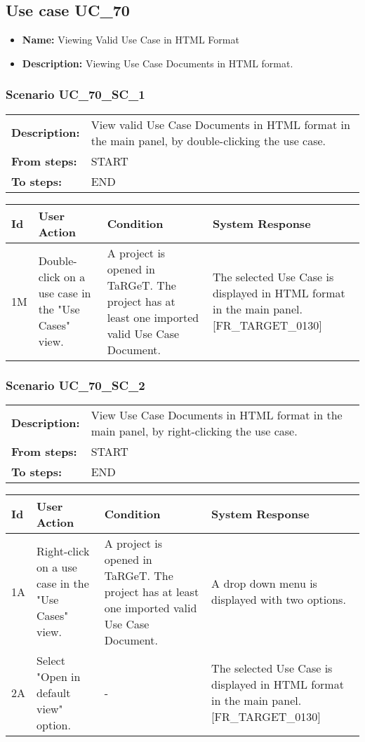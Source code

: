 \documentclass[a4paper,11pt]{article}
\newcommand{\bl}{\\ \hline}
\begin{document}
\subsection*{Use case UC_70}
\begin{itemize}
\item {\bf Name: }Viewing Valid Use Case in HTML Format
\item {\bf Description: }Viewing Use Case Documents in HTML format.
\end{itemize}
\subsubsection*{Scenario UC_70_SC_1}
\begin{tabular}{p{1in}p{4in}}
{\bf Description:} & View valid Use Case Documents in HTML format in the main panel, by double-clicking the use case. \\
{\bf From steps:} & START \\
{\bf To steps:} & END \\
\end{tabular}
 
\begin{tabular}{|p{0.8in}|p{1.6in}|p{1.6in}|p{1.6in}|}
\hline
Id & User Action & Condition & System Response  \bl 
1M & Double-click on a use case in the "Use Cases" view. & A project is opened in TaRGeT. The project has at least one imported valid Use Case Document. & The selected Use Case is displayed in HTML format in the main panel. [FR_TARGET_0130] \bl 
\end{tabular}
\subsubsection*{Scenario UC_70_SC_2}
\begin{tabular}{p{1in}p{4in}}
{\bf Description:} & View Use Case Documents in HTML format in the main panel, by right-clicking the use case. \\
{\bf From steps:} & START \\
{\bf To steps:} & END \\
\end{tabular}
 
\begin{tabular}{|p{0.8in}|p{1.6in}|p{1.6in}|p{1.6in}|}
\hline
Id & User Action & Condition & System Response  \bl 
1A & Right-click on a use case in the "Use Cases" view. & A project is opened in TaRGeT. The project has at least one imported valid Use Case Document. & A drop down menu is displayed with two options. \bl 
2A & Select "Open in default view" option. & - & The selected Use Case is displayed in HTML format in the main panel. [FR_TARGET_0130] \bl 
\end{tabular}
\end{document}
